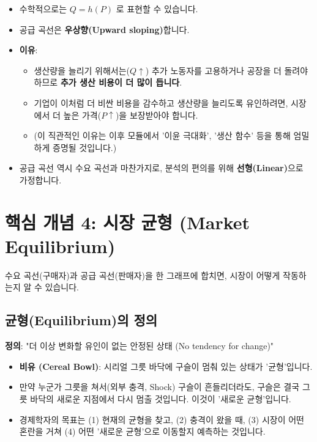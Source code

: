 \documentclass[11pt,a4paper]{article}
\theoremstyle{definition}
\begin{document}
\begin{itemize}
    \item 수학적으로는 $Q = h(P)$ 로 표현할 수 있습니다.
    \item 공급 곡선은 \textbf{우상향(Upward sloping)}합니다.
    \item \textbf{이유}:
        \begin{itemize}
            \item 생산량을 늘리기 위해서는($Q \uparrow$) 추가 노동자를 고용하거나 공장을 더 돌려야 하므로 \textbf{추가 생산 비용이 더 많이 듭니다}.
            \item 기업이 이처럼 더 비싼 비용을 감수하고 생산량을 늘리도록 유인하려면, 시장에서 더 높은 가격($P \uparrow$)을 보장받아야 합니다.
            \item (이 직관적인 이유는 이후 모듈에서 '이윤 극대화', '생산 함수' 등을 통해 엄밀하게 증명될 것입니다.)
        \end{itemize}
    \item 공급 곡선 역시 수요 곡선과 마찬가지로, 분석의 편의를 위해 \textbf{선형(Linear)}으로 가정합니다.
\end{itemize}

\newpage

\section{핵심 개념 4: 시장 균형 (Market Equilibrium)}

수요 곡선(구매자)과 공급 곡선(판매자)을 한 그래프에 합치면, 시장이 어떻게 작동하는지 알 수 있습니다.

\subsection{균형(Equilibrium)의 정의}

\textbf{정의}: "더 이상 변화할 유인이 없는 안정된 상태 (No tendency for change)"

\begin{itemize}
    \item \textbf{비유 (Cereal Bowl)}: 시리얼 그릇 바닥에 구슬이 멈춰 있는 상태가 '균형'입니다.
    \item 만약 누군가 그릇을 쳐서(외부 충격, Shock) 구슬이 흔들리더라도, 구슬은 결국 그릇 바닥의 새로운 지점에서 다시 멈출 것입니다. 이것이 '새로운 균형'입니다.
    \item 경제학자의 목표는 (1) 현재의 균형을 찾고, (2) 충격이 왔을 때, (3) 시장이 어떤 혼란을 거쳐 (4) 어떤 '새로운 균형'으로 이동할지 예측하는 것입니다.
\end{itemize}
\end{document}
